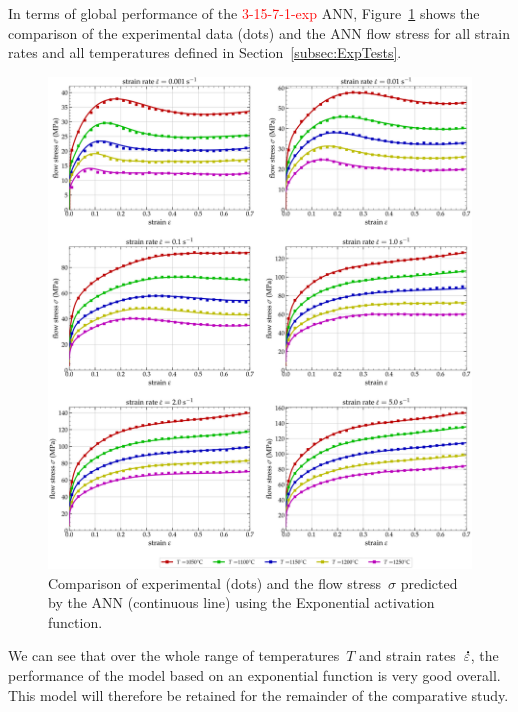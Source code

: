 \documentclass[algorithms,article,submit,pdftex,oneauthors]{Definitions/mdpi}
\DeclareRobustCommand{\mdot}[1]{\accentset{\mbox{\bfseries .}}{#1}}
\begin{document}
In terms of global performance of the \textcolor{red}{3-15-7-1-exp} ANN, Figure~\ref{fig:ANN-ExpFit} shows the comparison of the experimental data (dots) and the ANN flow stress for all strain rates and all temperatures defined in Section~\ref{subsec:ExpTests}.
\begin{figure}[h!]
\centering
\includegraphics[width=0.95\columnwidth]{Figures/3Cr2Mo-3-15-7-1-exponential}
\caption{Comparison of experimental (dots) and the flow stress~$\sigma$ predicted by the ANN (continuous line) using the Exponential activation function.}
\label{fig:ANN-ExpFit}
\end{figure}
We can see that over the whole range of temperatures~$T$ and strain rates~$\mdot{\varepsilon}$, the performance of the model based on an exponential function is very good overall.
This model will therefore be retained for the remainder of the comparative study.
\end{document}

